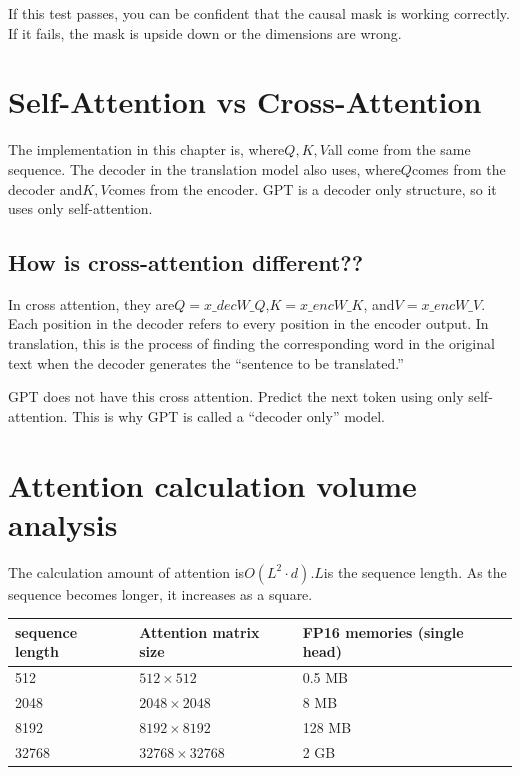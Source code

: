 If this test passes, you can be confident that the causal mask is working correctly. If it fails, the mask is upside down or the dimensions are wrong.

\section{Self-Attention vs Cross-Attention}

The implementation in this chapter is, where$Q, K, V$all come from the same sequence. The decoder in the translation model also uses, where$Q$comes from the decoder and$K, V$comes from the encoder. GPT is a decoder only structure, so it uses only self-attention.

\subsection{How is cross-attention different??}

In cross attention, they are$Q = x\_{dec} W\_Q$,$K = x\_{enc} W\_K$, and$V = x\_{enc} W\_V$. Each position in the decoder refers to every position in the encoder output. In translation, this is the process of finding the corresponding word in the original text when the decoder generates the ``sentence to be translated.''

GPT does not have this cross attention. Predict the next token using only self-attention. This is why GPT is called a ``decoder only'' model.

\section{Attention calculation volume analysis}

The calculation amount of attention is$O(L^2 \cdot d)$.$L$is the sequence length. As the sequence becomes longer, it increases as a square.

\begin{center}
\begin{tabularx}{\textwidth}{lXX}
\toprule
\textbf{sequence length}&\textbf{Attention matrix size}&\textbf{FP16 memories (single head)}\\
\midrule
512 & $512 \times 512$ & 0.5 MB \\
2048 & $2048 \times 2048$ & 8 MB \\
8192 & $8192 \times 8192$ & 128 MB \\
32768 & $32768 \times 32768$ & 2 GB \\
\bottomrule
\end{tabularx}
\end{center}

